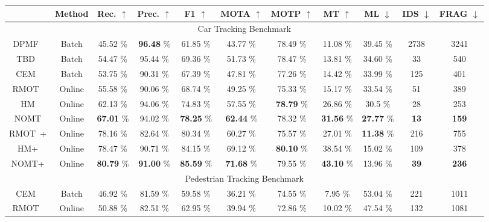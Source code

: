 \documentclass[10pt,twocolumn,letterpaper]{article}
\begin{document}
\begin{table*}
\begin{center}
{\scriptsize
\begin{tabular}{| c || c || c | c | c || c | c | c | c | c | c |}
\hline
& Method & Rec. $\uparrow$ & Prec. $\uparrow$ & F1 $\uparrow$ & MOTA $\uparrow$ & MOTP $\uparrow$ & MT $\uparrow$ & ML $\downarrow$ & IDS $\downarrow$ & FRAG $\downarrow$ \\ 
\hline
\hline
\multicolumn{11}{|c|}{Car Tracking Benchmark} \\
\hline
DPMF~\cite{Pirsiavash_CVPR_11} & Batch & 45.52 \% & {\bf 96.48} \% & 61.85 \% & 43.77 \% & 78.49 \% & 11.08 \% & 39.45 \% & 2738 & 3241 \\
TBD~\cite{Geiger2014PAMI} & Batch & 54.47 \% & 95.44 \% & 69.36 \% & 51.73 \% & 78.47 \% & 13.81 \% & 34.60 \% & 33 & 540 \\
CEM~\cite{Milan:2014:CEM} & Batch & 53.75 \% & 90.31 \% & 67.39 \% & 47.81 \% & 77.26 \% & 14.42 \% & 33.99 \% & 125 & 401 \\
RMOT~\cite{YoonWACV2015} & Online & 55.58 \% & 90.06 \% & 68.74 \% & 49.25 \% & 75.33 \% & 15.17 \% & 33.54 \% & 51 & 389 \\
\hline
HM & Online & 62.13 \% & 94.06 \% & 74.83 \% & 57.55 \% & {\bf 78.79} \% & 26.86 \% & 30.5 \% & 28 & 253 \\
NOMT & Online & {\bf 67.01 } \% & 94.02 \% & {\bf 78.25} \% & {\bf 62.44}  \% & 78.32 \% & {\bf 31.56} \% & {\bf 27.77} \% & {\bf 13} & {\bf 159} \\
\hline
\hline
RMOT~\cite{YoonWACV2015}+\cite{wang2013regionlets} & Online & 78.16 \% & 82.64 \% & 80.34 \% & 60.27 \% & 75.57 \% & 27.01 \% & {\bf 11.38} \% & 216 & 755 \\
\hline
HM+\cite{wang2013regionlets} & Online & 78.47  \% & 90.71 \% & 84.15 \% & 69.12  \% & {\bf 80.10} \% & 38.54 \% & 15.02 \% & 109 & 378\\
NOMT+\cite{wang2013regionlets} & Online & {\bf 80.79}  \% & {\bf 91.00} \% & {\bf 85.59} \% & {\bf 71.68}  \% & 79.55 \% & {\bf 43.10} \% & 13.96 \% & {\bf 39} & {\bf 236}\\
\hline
\hline
\multicolumn{11}{|c|}{Pedestrian Tracking Benchmark} \\
\hline
CEM~\cite{Milan:2014:CEM} & Batch & 46.92 \% & 81.59 \% & 59.58 \% & 36.21 \% & 74.55 \% & 7.95 \% & 53.04 \% & 221 & 1011 \\
RMOT~\cite{YoonWACV2015} & Online & 50.88 \% & 82.51 \% & 62.95 \% & 39.94 \% & 72.86 \% & 10.02 \% & 47.54 \% & 132 & 1081 \\

\end{tabular}}
\end{center}
\end{table*}
\end{document}
